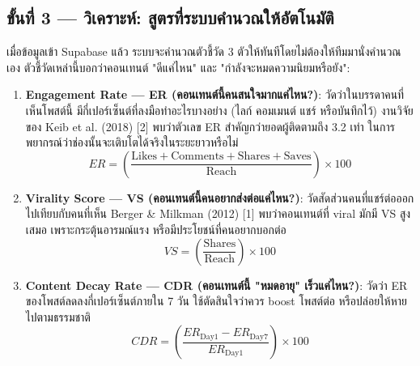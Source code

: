 \documentclass[10pt,a4paper]{article}
\begin{document}
\subsection{ขั้นที่ 3 — วิเคราะห์: สูตรที่ระบบคำนวณให้อัตโนมัติ}
เมื่อข้อมูลเข้า Supabase แล้ว ระบบจะคำนวณตัวชี้วัด 3 ตัวให้ทันทีโดยไม่ต้องให้ทีมมานั่งคำนวณเอง ตัวชี้วัดเหล่านี้บอกว่าคอนเทนต์ "ดีแค่ไหน" และ "กำลังจะหมดความนิยมหรือยัง":
\begin{enumerate}[label=\bfseries สูตรที่ \arabic*:]
  \item \textbf{Engagement Rate --- ER (คอนเทนต์นี้คนสนใจมากแค่ไหน?)}: วัดว่าในบรรดาคนที่เห็นโพสต์นี้ มีกี่เปอร์เซ็นต์ที่ลงมือทำอะไรบางอย่าง (ไลก์ คอมเมนต์ แชร์ หรือบันทึกไว้) งานวิจัยของ Keib et al. (2018) [2] พบว่าตัวเลข ER สำคัญกว่ายอดผู้ติดตามถึง 3.2 เท่า ในการพยากรณ์ว่าช่องนั้นจะเติบโตได้จริงในระยะยาวหรือไม่
    \begin{equation}
      ER = \left( \frac{\text{Likes} + \text{Comments} + \text{Shares} + \text{Saves}}{\text{Reach}} \right) \times 100
    \end{equation}
  \item \textbf{Virality Score --- VS (คอนเทนต์นี้คนอยากส่งต่อแค่ไหน?)}: วัดสัดส่วนคนที่แชร์ต่อออกไปเทียบกับคนที่เห็น Berger \& Milkman (2012) [1] พบว่าคอนเทนต์ที่ viral มักมี VS สูงเสมอ เพราะกระตุ้นอารมณ์แรง หรือมีประโยชน์ที่คนอยากบอกต่อ
    \begin{equation}
      VS = \left( \frac{\text{Shares}}{\text{Reach}} \right) \times 100
    \end{equation}
  \item \textbf{Content Decay Rate --- CDR (คอนเทนต์นี้ "หมดอายุ" เร็วแค่ไหน?)}: วัดว่า ER ของโพสต์ลดลงกี่เปอร์เซ็นต์ภายใน 7 วัน ใช้ตัดสินใจว่าควร boost โพสต์ต่อ หรือปล่อยให้หายไปตามธรรมชาติ
    \begin{equation}
      CDR = \left( \frac{ER_{\text{Day1}} - ER_{\text{Day7}}}{ER_{\text{Day1}}} \right) \times 100
    \end{equation}
\end{enumerate}
\end{document}
